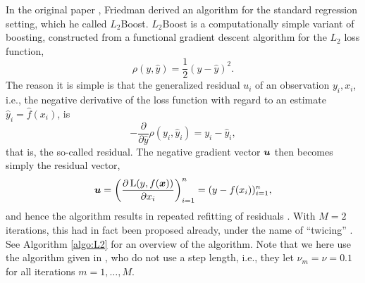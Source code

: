 In the original paper \citep{friedman2001}, Friedman derived an algorithm for the standard regression setting, which he called $L_2$Boost.
$L_2$Boost is a computationally simple variant of boosting, constructed from a functional gradient descent algorithm for the $L_2$ loss function,
\begin{equation*}
    \rho(y, \hat{y})=\frac{1}{2}(y-\hat{y})^2.
\end{equation*}
The reason it is simple is that the generalized residual $u_i$ of an observation $y_i,x_i$, i.e., the negative derivative of the loss function with regard to an estimate $\hat{y}_i=\hat{f}(x_i)$, is
\begin{equation*}
    -\frac{\partial}{\partial\hat{y}}\rho(y_i, \hat{y}_i)=y_i-\hat{y}_i,
\end{equation*}
that is, the so-called residual. The negative gradient vector $\bm{u}$ then becomes simply the residual vector,
\begin{equation*}
    \bm{u}=\left(\frac{\partial\operatorname{L}(y,f(\bm{x}))}{\partial x_i}\right)_{i=1}^n=(y-f(x_i))_{i=1}^n,
\end{equation*}
and hence the algorithm results in repeated refitting of residuals \citep{friedman2001,buhlmann-yu}.
With $M=2$ iterations, this had in fact been proposed already, under the name of ``twicing'' \citep{tukey}.
See Algorithm \ref{algo:L2} for an overview of the algorithm. Note that we here use the algorithm given in \citet{buhlmann-yu}, who do not use a step length, i.e., they let $\nu_m=\nu=0.1$ for all iterations $m=1,\ldots,M$.
